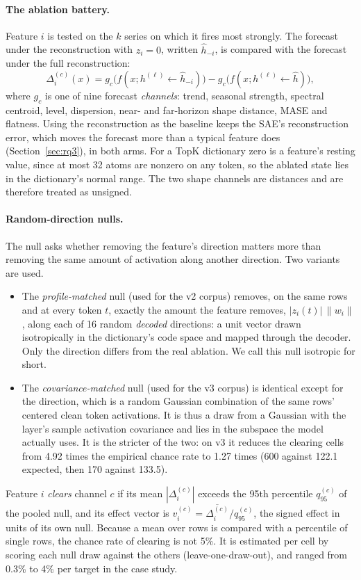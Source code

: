 \paragraph{The ablation battery.} Feature $i$ is tested on the $k$ series on which it fires most strongly. The
forecast under the reconstruction with $z_i=0$, written $\hat h_{-i}$, is compared with the forecast under the full
reconstruction:
\begin{equation}
  \Delta_i^{(c)}(x) = g_c\big(f(x;h^{(\ell)}\!\leftarrow\!\hat h_{-i})\big) - g_c\big(f(x;h^{(\ell)}\!\leftarrow\!\hat h)\big),
  \label{eq:ablation}
\end{equation}
where $g_c$ is one of nine forecast \emph{channels}: trend, seasonal strength, spectral centroid, level, dispersion,
near- and far-horizon shape distance, MASE and flatness. Using the reconstruction as the baseline keeps the SAE's
reconstruction error, which moves the forecast more than a typical feature does (Section~\ref{sec:rq3}), in both arms.
For a TopK dictionary zero is a feature's resting value, since at most 32 atoms are nonzero on any token, so the ablated
state lies in the dictionary's normal range. The two shape channels are distances and are therefore treated as unsigned.

\paragraph{Random-direction nulls.} The null asks whether removing the feature's direction matters more than removing
the same amount of activation along another direction. Two variants are used.
\begin{itemize}
  \item The \emph{profile-matched} null (used for the v2 corpus) removes, on the same rows and at every token $t$,
    exactly the amount the feature removes, $|z_i(t)|\,\|w_i\|$, along each of 16 random \emph{decoded} directions: a
    unit vector drawn isotropically in the dictionary's code space and mapped through the decoder. Only the direction
    differs from the real ablation. We call this null isotropic for short.
  \item The \emph{covariance-matched} null (used for the v3 corpus) is identical except for the direction, which is a
    random Gaussian combination of the same rows' centered clean token activations. It is thus a draw from a Gaussian
    with the layer's sample activation covariance and lies in the subspace the model actually uses. It is the stricter
    of the two: on v3 it reduces the clearing cells from 4.92 times the empirical chance rate to 1.27 times
    (600 against 122.1 expected, then 170 against 133.5).
\end{itemize}
Feature $i$ \emph{clears} channel $c$ if its mean $|\Delta_i^{(c)}|$ exceeds the 95th percentile $q_{95}^{(c)}$ of the
pooled null, and its effect vector is $v_i^{(c)}=\overline{\Delta_i^{(c)}}/q_{95}^{(c)}$, the signed effect in units of
its own null. Because a mean over rows is compared with a percentile of single rows, the chance rate of clearing is not
5\%. It is estimated per cell by scoring each null draw against the others (leave-one-draw-out), and ranged from 0.3\% to
4\% per target in the case study.

